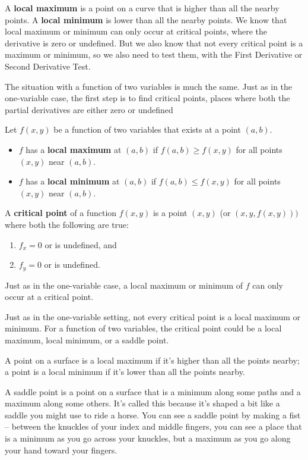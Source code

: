 A {\bf local maximum} is a point on a curve that is higher than all the nearby points. A {\bf local minimum} is lower than all the nearby points. We know that local maximum or minimum can only occur at critical points, where the derivative is zero or undefined. But we also know that not every critical point is a maximum or minimum, so we also need to test them, with the First Derivative or Second Derivative Test.

The situation with a function of two variables is much the same. Just as in the one-variable case, the first step is to find critical points, places where both the partial derivatives are either zero or undefined

\begin{definition}
Let $f(x,y)$ be a function of two variables that exists at a point $(a, b)$.
\begin{itemize}
  \item $f$ has a {\bf local maximum} at $(a,b)$ if $f(a,b) \geq f(x,y)$ for all points $(x,y)$ near $(a,b)$.
  \item $f$ has a {\bf local minimum} at $(a,b)$ if $f(a,b) \leq f(x,y)$ for all points $(x,y)$ near $(a,b)$.
\end{itemize}
A {\bf critical point} of a function $f(x,y)$ is a point $(x,y)$ (or $(x,y,f(x,y)))$ where both the following are true:
\begin{enumerate}
  \item $f_x=0$ or is undefined, and
  \item $f_y=0$ or is undefined.
\end{enumerate}
Just as in the one-variable case, a local maximum or minimum of $f$ can only occur at a critical point.
\end{definition}
Just as in the one-variable setting, not every critical point is a local maximum or minimum. For a function of two variables, the critical point could be a local maximum, local minimum, or a saddle point.

A point on a surface is a local maximum if it's higher than all the points nearby; a point is a local minimum if it's lower than all the points nearby.

A saddle point is a point on a surface that is a minimum along some paths and a maximum along some others. It's called this because it's shaped a bit like a saddle you might use to ride a horse. You can see a saddle point by making a fist – between the knuckles of your index and middle fingers, you can see a place that is a minimum as you go across your knuckles, but a maximum as you go along your hand toward your fingers.

